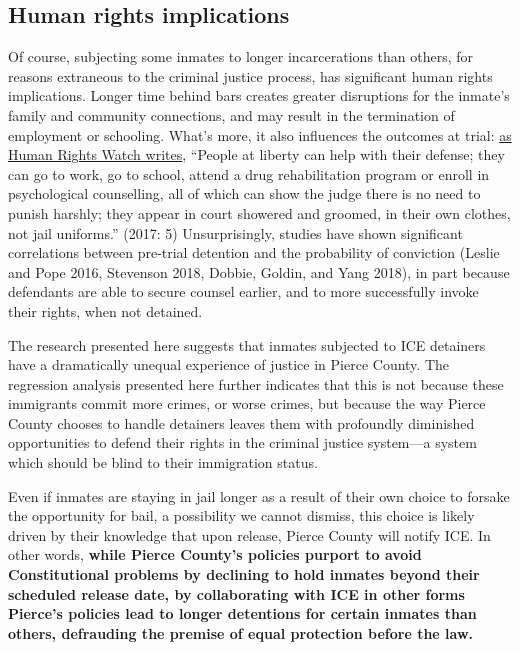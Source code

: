 \documentclass[12pt]{report}\usepackage[]{graphicx}\usepackage[]{color}
\begin{document}
\subsection*{Human rights implications}

Of course, subjecting some inmates to longer incarcerations than others, for reasons extraneous to the criminal justice process, has significant human rights implications. Longer time behind bars creates greater disruptions for the inmate's family and community connections, and may result in the termination of employment or schooling. What's more, it also influences the outcomes at trial: \href{<https://www.hrw.org/report/2017/04/11/not-it-justice/how-californias-pretrial-detention-and-bail-system-unfairly>}{as Human Rights Watch writes}, ``People at liberty can help with their defense; they can go to work, go to school, attend a drug rehabilitation program or enroll in psychological counselling, all of which can show the judge there is no need to punish harshly; they appear in court showered and groomed, in their own clothes, not jail uniforms.'' (2017: 5) Unsurprisingly, studies have shown significant correlations between pre-trial detention and the probability of conviction (Leslie and Pope 2016, Stevenson 2018, Dobbie, Goldin, and Yang 2018), in part because defendants are able to secure counsel earlier, and to more successfully invoke their rights, when not detained.

The research presented here suggests that inmates subjected to ICE detainers have a dramatically unequal experience of justice in Pierce County. The regression analysis presented here further indicates that this is not because these immigrants commit more crimes, or worse crimes, but because the way Pierce County chooses to handle detainers leaves them with profoundly diminished opportunities to defend their rights in the criminal justice system---a system which should be blind to their immigration status. 

Even if inmates are staying in jail longer as a result of their own choice to forsake the opportunity for bail, a possibility we cannot dismiss, this choice is likely driven by their knowledge that upon release, Pierce County will notify ICE. In other words, \textbf{while Pierce County's policies purport to avoid Constitutional problems by declining to hold inmates beyond their scheduled release date, by collaborating with ICE in other forms Pierce's policies lead to longer detentions for certain inmates than others, defrauding the premise of equal protection before the law.}
\end{document}
